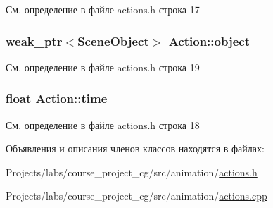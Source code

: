 См. определение в файле actions.\+h строка 17

\subsubsection[{\texorpdfstring{object}{object}}]{\setlength{\rightskip}{0pt plus 5cm}weak\+\_\+ptr$<${\bf Scene\+Object}$>$ Action\+::object\hspace{0.3cm}{\ttfamily [protected]}}\hypertarget{class_action_a1dfd6b0f501cce2b19d076b7d6b5aec8}{}\label{class_action_a1dfd6b0f501cce2b19d076b7d6b5aec8}


См. определение в файле actions.\+h строка 19

\subsubsection[{\texorpdfstring{time}{time}}]{\setlength{\rightskip}{0pt plus 5cm}float Action\+::time\hspace{0.3cm}{\ttfamily [protected]}}\hypertarget{class_action_a11d29bdc060c2c492d170632507c0635}{}\label{class_action_a11d29bdc060c2c492d170632507c0635}


См. определение в файле actions.\+h строка 18



Объявления и описания членов классов находятся в файлах\+:\begin{DoxyCompactItemize}
\item 
Projects/labs/course\+\_\+project\+\_\+cg/src/animation/\hyperlink{actions_8h}{actions.\+h}\item 
Projects/labs/course\+\_\+project\+\_\+cg/src/animation/\hyperlink{actions_8cpp}{actions.\+cpp}\end{DoxyCompactItemize}
